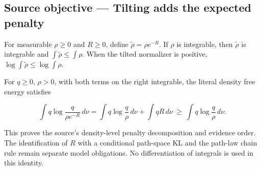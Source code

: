 \documentclass[11pt,a4paper]{report}
\begin{document}
\subsection{\texorpdfstring{Source objective — Tilting adds the expected penalty}{Source objective — Tilting adds the expected penalty}}



For measurable \(\rho\ge0\) and \(R\ge0\), define \(\widetilde\rho=\rho e^{-R}\). If \(\rho\) is integrable, then \(\widetilde\rho\) is integrable and \(\int\widetilde\rho\le\int\rho\). When the tilted normalizer is positive, \(\log\int\widetilde\rho\le\log\int\rho\).




For \(q\ge0\), \(\rho>0\), with both terms on the right integrable, the literal density free energy satisfies



\[\int q\log\frac{q}{\rho e^{-R}}\,d\nu=\int q\log\frac q\rho\,d\nu+\int qR\,d\nu\ \ge\ \int q\log\frac q\rho\,d\nu.\]



This proves the source's density-level penalty decomposition and evidence order. The identification of \(R\) with a conditional path-space KL and the path-law chain rule remain separate model obligations. No differentiation of integrals is used in this identity.
\end{document}
